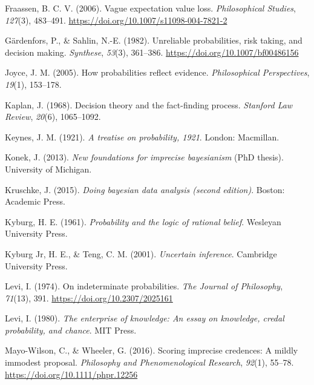 \documentclass[
  10pt,
  dvipsnames,enabledeprecatedfontcommands]{scrartcl}
\newlength{\cslhangindent}
\newenvironment{CSLReferences}[2] %
 {\begin{list}{}{%
  \setlength{\itemindent}{0pt}
  \setlength{\leftmargin}{0pt}
  \setlength{\parsep}{0pt}
  \ifodd #1
   \setlength{\leftmargin}{\cslhangindent}
   \setlength{\itemindent}{-1\cslhangindent}
  \fi
  \setlength{\itemsep}{#2\baselineskip}}}
 {\end{list}}
\begin{document}
\begin{CSLReferences}{1}{0}
Fraassen, B. C. V. (2006). Vague expectation value loss.
\emph{Philosophical Studies}, \emph{127}(3), 483--491.
\url{https://doi.org/10.1007/s11098-004-7821-2}

Gärdenfors, P., \& Sahlin, N.-E. (1982). Unreliable probabilities, risk
taking, and decision making. \emph{Synthese}, \emph{53}(3), 361--386.
\url{https://doi.org/10.1007/bf00486156}

Joyce, J. M. (2005). How probabilities reflect evidence.
\emph{Philosophical Perspectives}, \emph{19}(1), 153--178.

Kaplan, J. (1968). Decision theory and the fact-finding process.
\emph{Stanford Law Review}, \emph{20}(6), 1065--1092.

Keynes, J. M. (1921). \emph{A treatise on probability, 1921}. London:
Macmillan.

Konek, J. (2013). \emph{New foundations for imprecise bayesianism} (PhD
thesis). University of Michigan.

Kruschke, J. (2015). \emph{Doing bayesian data analysis (second
edition)}. Boston: Academic Press.

Kyburg, H. E. (1961). \emph{Probability and the logic of rational
belief}. Wesleyan University Press.

Kyburg Jr, H. E., \& Teng, C. M. (2001). \emph{Uncertain inference}.
Cambridge University Press.

Levi, I. (1974). On indeterminate probabilities. \emph{The Journal of
Philosophy}, \emph{71}(13), 391. \url{https://doi.org/10.2307/2025161}

Levi, I. (1980). \emph{The enterprise of knowledge: An essay on
knowledge, credal probability, and chance}. MIT Press.

Mayo-Wilson, C., \& Wheeler, G. (2016). Scoring imprecise credences: A
mildly immodest proposal. \emph{Philosophy and Phenomenological
Research}, \emph{92}(1), 55--78.
\url{https://doi.org/10.1111/phpr.12256}


\end{CSLReferences}
\end{document}
